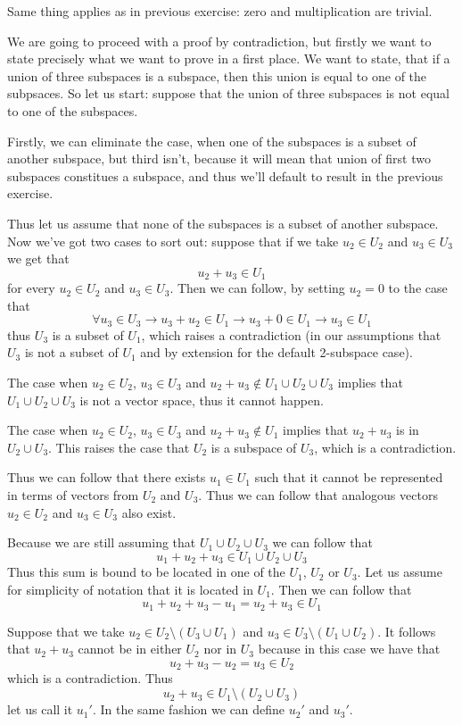 \documentclass[10pt,oneside,titlepage]{book}
\begin{document}
Same thing applies as in previous exercise: zero and multiplication are
trivial.

We are going to proceed with a proof by contradiction, but firstly we want
to state precisely what we want to prove in a first place. We want to state,
that if a union of three subspaces is a subspace, then this union is equal to
one of the subpsaces. So let us start: suppose that the union of three subspaces is not equal to one of the subspaces.

Firstly, we can eliminate the case, when one of the subspaces is a
subset of another subspace, but third isn't, because it will mean that
union of first two subspaces constitues a subspace, and thus we'll default
to result in the previous exercise.

Thus let us assume that none of the subspaces is a subset of another subspace.
Now we've got two cases to sort out: suppose that if we take $u_2 \in U_2$
and $u_3 \in U_3$ we get that
$$u_2 + u_3 \in U_1$$
for every $u_2 \in U_2$ and $u_3 \in U_3$. Then we can follow, by setting
$u_2 = 0$ to the case that
$$\forall u_3 \in U_3 \to u_3 + u_2 \in U_1 \to u_3 + 0 \in U_1 \to
u_3 \in U_1$$
thus $U_3$ is a subset of $U_1$, which raises a contradiction (in our
assumptions that $U_3$ is not a subset of $U_1$  and by extension
for the default 2-subspace case).

The case when $u_2 \in U_2$, $u_3 \in U_3$ and $u_2 + u_3 \notin
U_1 \cup U_2 \cup U_3$ implies that $U_1 \cup U_2 \cup U_3$ is
not a vector space, thus it cannot happen.

The case when $u_2 \in U_2$, $u_3 \in U_3$ and $u_2 + u_3 \notin U_1$
implies that $u_2 + u_3$ is  in $U_2 \cup U_3$. This raises the case that
$U_2$ is a subspace of $U_3$, which is a contradiction.

Thus we can follow that there exists $u_1 \in U_1$ such that it
cannot be represented in terms of vectors from $U_2$ and $U_3$.
Thus we can follow that analogous  vectors   $u_2 \in U_2$ and $u_3 \in U_3$
also exist.

Because we are still assuming that $U_1 \cup U_2 \cup U_3$ we can follow that
$$u_1 + u_2 + u_3 \in U_1 \cup U_2 \cup U_3$$
Thus this sum is bound to be located in one of the $U_1$, $U_2$ or $U_3$.
Let us assume for simplicity of notation that it is located in $U_1$. Then
we can follow that
$$u_1 + u_2 + u_3 - u_1 = u_2 + u_3 \in U_1$$

Suppose that we take $u_2 \in U_2 \setminus (U_3 \cup U_1)$ and
$u_3 \in U_3 \setminus (U_1 \cup U_2)$. It follows that
$u_2 + u_3$ cannot be in either $U_2$ nor in $U_3$ because in this
case we have that
$$u_2 + u_3 - u_2 = u_3 \in U_2$$
which is a contradiction. Thus
$$u_2 + u_3 \in U_1 \setminus (U_2 \cup U_3)$$
let us call it $u_1'$. In the same fashion we can define $u_2'$ and $u_3'$.
\end{document}
